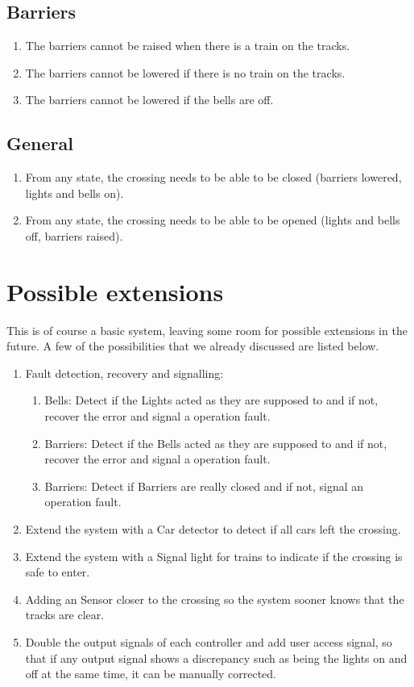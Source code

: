 \documentclass[final]{report}
\begin{document}
\subsection{Barriers}
	\begin{enumerate}
		\item The barriers cannot be raised when there is a train on the tracks.
		\item The barriers cannot be lowered if there is no train on the tracks.
		\item The barriers cannot be lowered if the bells are off.
	\end{enumerate}
	
\subsection{General}
	\begin{enumerate}
	\item From any state, the crossing needs to be able to be closed (barriers lowered, lights and bells on).
	\item From any state, the crossing needs to be able to be opened (lights and bells off, barriers raised).
	\end{enumerate}


\section{Possible extensions}
This is of course a basic system, leaving some room for possible extensions in the future.
A few of the possibilities that we already discussed are listed below.

	\begin{enumerate}
	\item Fault detection, recovery and signalling:
		\begin{enumerate}
			\item Bells: Detect if the Lights acted as they are supposed to and if not, recover the error and signal a operation fault.
			\item Barriers: Detect if the Bells acted as they are supposed to and if not, recover the error and signal a operation fault.
			\item Barriers: Detect if Barriers are really closed and if not, signal an operation fault.
		\end{enumerate}

	\item Extend the system with a Car detector to detect if all cars left the crossing.
	\item Extend the system with a Signal light for trains to indicate if the crossing is safe to enter.
	\item Adding an Sensor closer to the crossing so the system sooner knows that the tracks are clear.
	\item Double the output signals of each controller and add user access signal, so that if any output signal shows a discrepancy such as being the lights on and off at the same time, it can be manually corrected.
	\end{enumerate}
\end{document}
